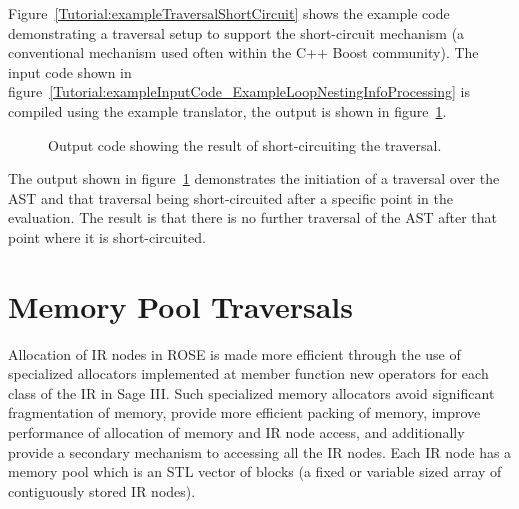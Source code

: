 Figure~\ref{Tutorial:exampleTraversalShortCircuit} shows the example code demonstrating a
traversal setup to support the short-circuit mechanism (a conventional mechanism used
often within the C++ Boost community). The input code shown in 
figure~\ref{Tutorial:exampleInputCode_ExampleLoopNestingInfoProcessing}
is compiled using the example translator, the output is shown in 
figure~\ref{Tutorial:exampleOutput_traversalShortCircuit}.

\begin{figure}[!h]
{\indent
{\mySmallFontSize

\begin{latexonly}
   
\end{latexonly}

\begin{htmlonly}
   
\end{htmlonly}

}
}
\caption{Output code showing the result of short-circuiting the traversal.}
\label{Tutorial:exampleOutput_traversalShortCircuit}
\end{figure}

   The output shown in figure~\ref{Tutorial:exampleOutput_traversalShortCircuit}
demonstrates the initiation of a traversal over the AST and that traversal
being short-circuited after a specific point in the evaluation.  The result is
that there is no further traversal of the AST after that point where it is
short-circuited.




   
\clearpage
\section{Memory Pool Traversals}
\label{Tutorial:memoryPoolTraversals}

   Allocation of IR nodes in ROSE is made more efficient through the
use of specialized allocators implemented at member function new operators
for each class of the IR in Sage III.  Such specialized memory allocators 
avoid significant fragmentation of memory, provide more efficient packing 
of memory, improve performance of allocation of memory and IR node access, and additionally
provide a secondary mechanism to accessing all the IR nodes.  Each IR
node has a memory pool which is an STL vector of blocks (a fixed or variable 
sized array of contiguously stored IR nodes).  

